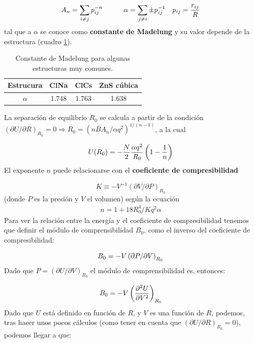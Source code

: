 \begin{equation}
    A_n = \sum_{i\neq j} p_{ij}^{-n} \quad \quad \quad \alpha = \sum_{j \neq i} \pm p_{ij}^{-1} \quad p_{ij} = \frac{r_{ij}}{R}
\end{equation}
tal que a $\alpha$ se conoce como \textbf{constante de Madelung} y su valor depende de la estructura (cuadro \ref{Tab:03-02}).

\begin{table}[h!] \centering
    \begin{tabular}{c|ccc}
        Estrucura & ClNa & ClCs & ZnS cúbica \\ \hline
        $\alpha$ & 1.748 & 1.763 & 1.638 
    \end{tabular}
    \caption{Constante de Madelung para algunas estructuras muy comunes.}
    \label{Tab:03-02}
\end{table}

La separación de equilibrio $R_0$ se calcula a partir  de la condición $(\partial U / \partial R)_{R_0} = 0 \Rightarrow R_0 = (nBA_n/\alpha q^2)^{1/(n-1)}$, a la cual

\begin{equation}
U(R_0) = - \frac{N}{2} \frac{\alpha q^2}{R_0} \left( 1-\frac{1}{n} \right) \label{Ec:03-03-04}
\end{equation}
El exponente $n$ puede relacionarse con el \textbf{coeficiente de compresibilidad} 

\begin{equation*}
	K\equiv - V^{-1}(\partial V / \partial P)_{R_0}
\end{equation*}
(donde $P$ es la presión y $V$ el volumen) según la ecuación
\begin{eqnarray}
	n=1+18R_0^4 / Kq^2 \alpha
\end{eqnarray}
Para ver la relación entre la energía y el coeficiente de compresibilidad tenemos que definir el módulo de comprensibilidad $B_0$, como el inverso del coeficiente de compresibilidad:

\begin{equation}
	B_0 = - V \left( \partial P / \partial V \right)_{R_0}
\end{equation}
Dado que $P=(\partial U / \partial V)_{R_0}$ el módulo de comprensibilidad es, entonces:

\begin{equation}
	B_0 =  - V \left( \frac{\partial ^2U}{\partial V^2} \right)_{R_0}
\end{equation}
Dado que $U$ está definido en función de $R$, y $V$ es una función de $R$, podemos, tras hacer unos pocos cálculos (como tener en cuenta que $(\partial U / \partial R)_{R_0}=0$), podemos llegar a que:

